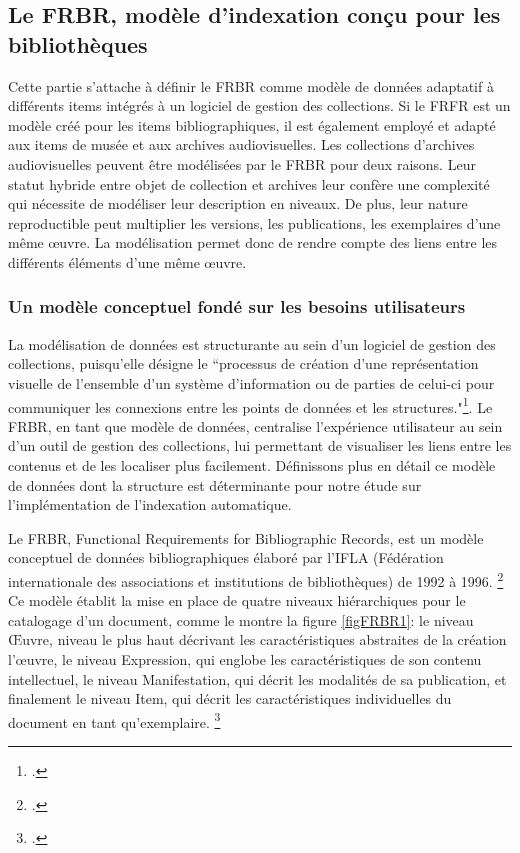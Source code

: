 \subsection{Le FRBR, modèle d'indexation conçu pour les bibliothèques} 


Cette partie s’attache à définir le \gls{FRBR} comme modèle de données adaptatif à différents items intégrés à un logiciel de gestion des collections. Si le FRFR est un modèle créé pour les items bibliographiques, il est également employé et adapté aux items de musée et aux archives audiovisuelles. Les collections d’archives audiovisuelles peuvent être modélisées par le \gls{FRBR} pour deux raisons. Leur statut hybride entre objet de collection et archives leur confère une complexité qui nécessite de modéliser leur description en niveaux. De plus, leur nature reproductible peut multiplier les versions, les publications, les exemplaires d’une même œuvre. La modélisation permet donc de rendre compte des liens entre les différents éléments d’une même œuvre. 


\subsubsection{Un modèle conceptuel fondé sur les besoins utilisateurs}

La modélisation de données est structurante au sein d’un logiciel de gestion des collections, puisqu’elle désigne le “processus de création d’une représentation visuelle de l’ensemble d’un système d’information ou de parties de celui-ci pour communiquer les connexions entre les points de données et les structures."\footcite{2021d}. Le \gls{FRBR}, en tant que modèle de données, centralise l’expérience utilisateur au sein d’un outil de gestion des collections, lui permettant de visualiser les liens entre les contenus et de les localiser plus facilement.  Définissons plus en détail ce modèle de données dont la structure est déterminante pour notre étude sur l’implémentation de l’indexation automatique. 

Le FRBR, Functional Requirements for Bibliographic Records, est un modèle conceptuel de données bibliographiques élaboré par l'\gls{IFLA} (Fédération internationale des associations et institutions de bibliothèques) de 1992 à 1996. \footcite{zotero-item-651} Ce modèle établit la mise en place de quatre niveaux hiérarchiques pour le catalogage d'un document, comme le montre la figure \ref{figFRBR1}: le niveau Œuvre, niveau le plus haut décrivant les caractéristiques abstraites de la création l’œuvre, le niveau Expression, qui englobe les caractéristiques de son contenu intellectuel, le niveau Manifestation, qui décrit les modalités de sa publication, et finalement le niveau Item, qui décrit les caractéristiques individuelles du document en tant qu'exemplaire.  \footcite{zotero-item-651}  



